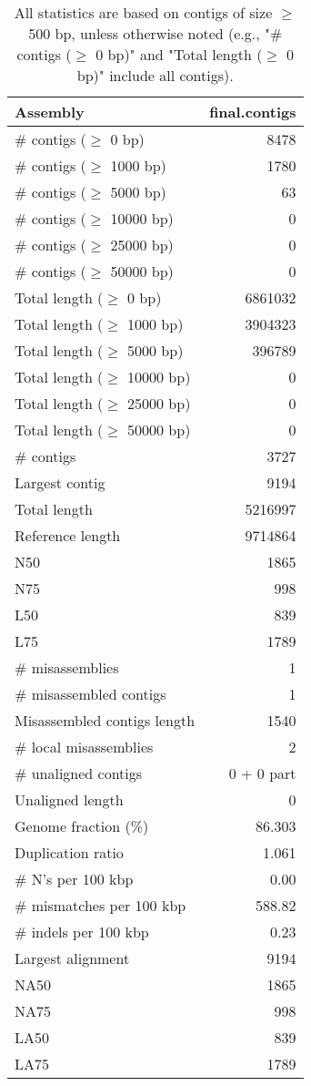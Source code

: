 \documentclass[12pt,a4paper]{article}
\begin{document}
\begin{table}[ht]
\begin{center}
\caption{All statistics are based on contigs of size $\geq$ 500 bp, unless otherwise noted (e.g., "\# contigs ($\geq$ 0 bp)" and "Total length ($\geq$ 0 bp)" include all contigs).}
\begin{tabular}{|l*{1}{|r}|}
\hline
Assembly & final.contigs \\ \hline
\# contigs ($\geq$ 0 bp) & 8478 \\ \hline
\# contigs ($\geq$ 1000 bp) & 1780 \\ \hline
\# contigs ($\geq$ 5000 bp) & 63 \\ \hline
\# contigs ($\geq$ 10000 bp) & 0 \\ \hline
\# contigs ($\geq$ 25000 bp) & 0 \\ \hline
\# contigs ($\geq$ 50000 bp) & 0 \\ \hline
Total length ($\geq$ 0 bp) & 6861032 \\ \hline
Total length ($\geq$ 1000 bp) & 3904323 \\ \hline
Total length ($\geq$ 5000 bp) & 396789 \\ \hline
Total length ($\geq$ 10000 bp) & 0 \\ \hline
Total length ($\geq$ 25000 bp) & 0 \\ \hline
Total length ($\geq$ 50000 bp) & 0 \\ \hline
\# contigs & 3727 \\ \hline
Largest contig & 9194 \\ \hline
Total length & 5216997 \\ \hline
Reference length & 9714864 \\ \hline
N50 & 1865 \\ \hline
N75 & 998 \\ \hline
L50 & 839 \\ \hline
L75 & 1789 \\ \hline
\# misassemblies & 1 \\ \hline
\# misassembled contigs & 1 \\ \hline
Misassembled contigs length & 1540 \\ \hline
\# local misassemblies & 2 \\ \hline
\# unaligned contigs & 0 + 0 part \\ \hline
Unaligned length & 0 \\ \hline
Genome fraction (\%) & 86.303 \\ \hline
Duplication ratio & 1.061 \\ \hline
\# N's per 100 kbp & 0.00 \\ \hline
\# mismatches per 100 kbp & 588.82 \\ \hline
\# indels per 100 kbp & 0.23 \\ \hline
Largest alignment & 9194 \\ \hline
NA50 & 1865 \\ \hline
NA75 & 998 \\ \hline
LA50 & 839 \\ \hline
LA75 & 1789 \\ \hline
\end{tabular}
\end{center}
\end{table}
\end{document}
